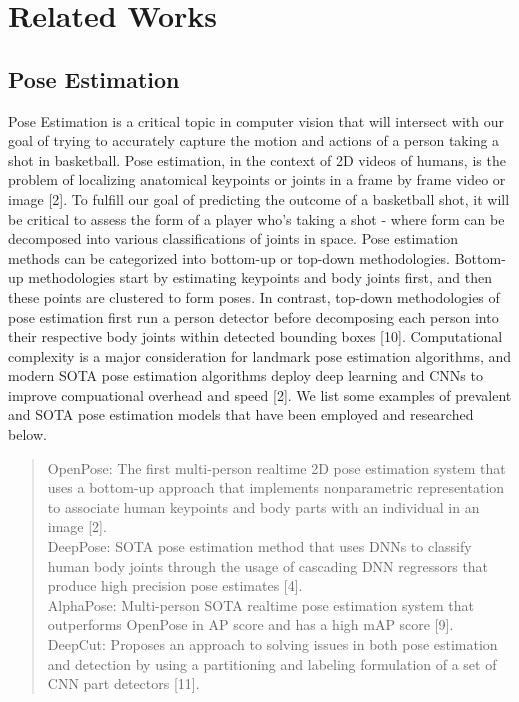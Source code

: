 \documentclass[10pt,twocolumn,letterpaper]{article}
\begin{document}
\section{Related Works}
\label{sec:formatting}

\subsection{Pose Estimation}

Pose Estimation is a critical topic in computer vision that will intersect with our goal of trying to accurately capture the motion and actions of a person taking a shot in basketball. Pose estimation, in the context of 2D videos of humans, is the problem of localizing anatomical keypoints or joints in a frame by frame video or image [2]. To fulfill our goal of predicting the outcome of a basketball shot, it will be critical to assess the form of a player who's taking a shot - where form can be decomposed into various classifications of joints in space. Pose estimation methods can be categorized into bottom-up or top-down methodologies. Bottom-up methodologies start by estimating keypoints and body joints first, and then these points are clustered to form poses. In contrast, 
top-down methodologies of pose estimation first run a person detector before decomposing each person into their respective body joints within detected bounding boxes [10]. Computational complexity is a major consideration for landmark pose estimation algorithms, and modern SOTA pose estimation algorithms deploy deep learning and CNNs to improve compuational overhead and speed [2]. We list some examples of prevalent and SOTA pose estimation models that have been employed and researched below.
%
\begin{quotation}
  OpenPose: The first multi-person realtime 2D pose estimation system that uses a bottom-up approach that implements nonparametric representation to associate human keypoints and body parts with an individual in an image [2]. \\
  \newline
  \indent DeepPose: SOTA pose estimation method that uses DNNs to classify human body joints through the usage of cascading DNN regressors that produce high precision pose estimates [4]. \\
  \newline
  \indent AlphaPose: Multi-person SOTA realtime pose estimation system that outperforms OpenPose in AP score and has a high mAP score [9]. \\
  \newline
  \indent DeepCut: Proposes an approach to solving issues in both pose estimation and detection by using a partitioning and labeling formulation of a set of CNN part detectors [11].
\end{quotation}
%
 
\end{document}
